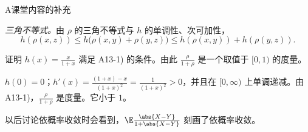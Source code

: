 \begin{exercises}{A}{课堂内容的补充}
\begin{questions}
\begin{solution}
\emph{三角不等式。}由 $\rho$ 的三角不等式与 $h$ 的单调性、次可加性，
\[
h(\rho(x,z))\leqslant h\bigl(\rho(x,y)+\rho(y,z)\bigr)\leqslant h(\rho(x,y))+h(\rho(y,z)).
\]
\end{solution}
\item 证明 $h(x)=\frac x{1+x}$ 满足 A13-1) 的条件。由此 $\frac{\rho}{1+\rho}$ 是一个取值于 $[0,1)$ 的度量。
\begin{solution}
$h(0)=0$；$h'(x)=\frac{(1+x)-x}{(1+x)^2}=\frac1{(1+x)^2}>0$，并且在 $[0,\infty)$ 上单调递减。由 A13-1)，$\frac\rho{1+\rho}$ 是度量。它小于 $1$。

以后讨论依概率收敛时会看到，$\E\frac{\abs{X-Y}}{1+\abs{X-Y}}$ 刻画了依概率收敛。
\end{solution}
\end{questions}
\end{exercises}

